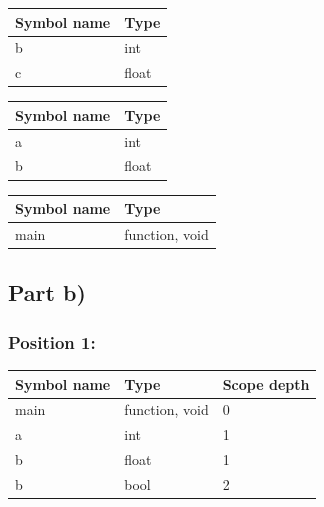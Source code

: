 \documentclass[paper=a4, fontsize=11pt]{scrartcl} %
\numberwithin{equation}{section} %
\numberwithin{figure}{section} %
\numberwithin{table}{section} %
\begin{document}
\begin{table}[ht!]
    \center
    \begin{tabular}{|l|l|}
    \hline
    Symbol name & Type           \\ \hline
    b        & int \\ \hline
    c        & float \\ \hline
    \end{tabular}
\end{table}

\begin{table}[ht!]
    \center
    \begin{tabular}{|l|l|}
    \hline
    Symbol name & Type           \\ \hline
    a        & int   \\ \hline
    b        & float \\ \hline
    \end{tabular}
\end{table}

\begin{table}[ht!]
    \center
    \begin{tabular}{|l|l|}
    \hline
    Symbol name & Type           \\ \hline
    main        & function, void \\ \hline
    \end{tabular}
\end{table}

\subsection{Part b)}

\subsubsection{Position 1:}
\begin{table}[ht!]
    \center
    \begin{tabular}{|l|l|l|}
    \hline
    Symbol name & Type           & Scope depth \\ \hline
    main        & function, void & 0 \\ \hline
    a        & int     & 1 \\ \hline
    b        & float   & 1 \\ \hline
    b        & bool    & 2 \\ \hline
    \end{tabular}
\end{table}
\end{document}
